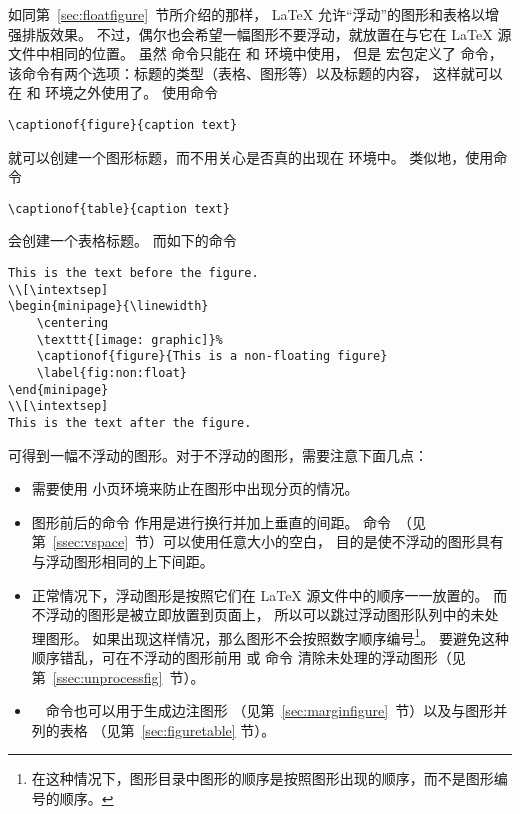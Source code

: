 如同第~\ref{sec:floatfigure}~节所介绍的那样，
\LaTeX{} 允许“浮动”的图形和表格以增强排版效果。
不过，偶尔也会希望一幅图形不要浮动，就放置在与它在 \LaTeX{} 源文件中相同的位置。
虽然  命令只能在  和  环境中使用，
但是  宏包定义了  命令，
该命令有两个选项：标题的类型（表格、图形等）以及标题的内容，
这样就可以在  和  环境之外使用了。
使用命令
\begin{lstlisting}
\captionof{figure}{caption text}
\end{lstlisting}
就可以创建一个图形标题，而不用关心是否真的出现在  环境中。
类似地，使用命令
\begin{lstlisting}
\captionof{table}{caption text}
\end{lstlisting}
会创建一个表格标题。
而如下的命令
\begin{lstlisting}
This is the text before the figure.
\\[\intextsep]
\begin{minipage}{\linewidth}
	\centering
	\texttt{[image: graphic]}%
	\captionof{figure}{This is a non-floating figure}
	\label{fig:non:float}
\end{minipage}
\\[\intextsep]
This is the text after the figure.
\end{lstlisting}
可得到一幅不浮动的图形。对于不浮动的图形，需要注意下面几点：
\begin{itemize}
	\item 需要使用  小页环境来防止在图形中出现分页的情况。
	\item 图形前后的命令  作用是进行换行并加上垂直的间距。
	 命令~（见第~\ref{ssec:vspace}~节）可以使用任意大小的空白，
	目的是使不浮动的图形具有与浮动图形相同的上下间距。
	\item 正常情况下，浮动图形是按照它们在 \LaTeX{} 源文件中的顺序一一放置的。
	而不浮动的图形是被立即放置到页面上，
	所以可以跳过浮动图形队列中的未处理图形。
	如果出现这样情况，那么图形不会按照数字顺序编号\footnote{
		在这种情况下，图形目录中图形的顺序是按照图形出现的顺序，而不是图形编号的顺序。}。
	要避免这种顺序错乱，可在不浮动的图形前用  或  命令
	清除未处理的浮动图形（见第~\ref{ssec:unprocessfig}~节）。
	\item {}　命令也可以用于生成边注图形
	（见第~\ref{sec:marginfigure}~节）以及与图形并列的表格
	（见第~\ref{sec:figuretable} 节）。
\end{itemize}

